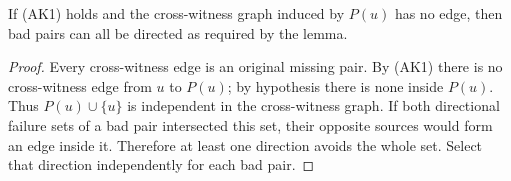 \begin{corollary}
\label{cor:all-keeper-independent-far-in}
If (AK1) holds and the cross-witness graph induced by $P(u)$ has
no edge, then bad pairs can all be directed as required by the lemma.
\end{corollary}

\begin{proof}
Every cross-witness edge is an original missing pair. By (AK1)
there is no cross-witness edge from $u$ to $P(u)$; by hypothesis
there is none inside $P(u)$. Thus $P(u)\cup\{u\}$ is independent
in the cross-witness graph. If both directional failure sets of a
bad pair intersected this set, their opposite sources would form
an edge inside it. Therefore at least one direction avoids the
whole set. Select that direction independently for each bad pair.
\end{proof}
